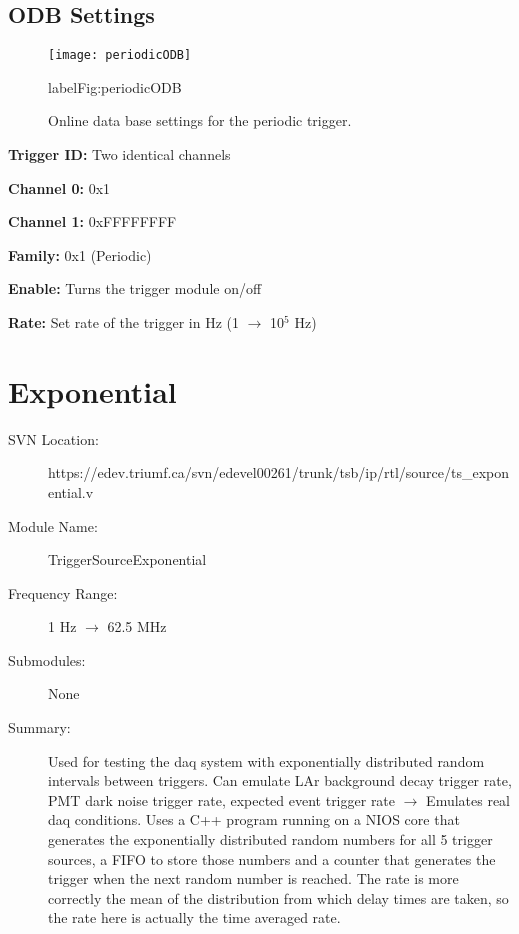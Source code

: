 \subsection{ODB Settings}
\label{sec:periodicODB}

\begin{figure}[ht]
\centering
\texttt{[image: periodicODB]}
\caption{Online data base settings for the periodic trigger.}
label{Fig:periodicODB}
\end{figure}

\begin{description}
\item \textbf{Trigger ID: } Two identical channels
	\begin{description}
	\item \textbf{Channel 0: }0x1
	\item \textbf{Channel 1: }0xFFFFFFFF
	\end{description}

\item \textbf{Family: } 0x1 (Periodic)

\item \textbf{Enable: }Turns the trigger module on/off

\item \textbf{Rate: }Set rate of the trigger in Hz (1 $\rightarrow$ 10$^5$ Hz)
\end{description}

\section{Exponential}


\begin{description}
\item[SVN Location: ]https://edev.triumf.ca/svn/edevel00261/trunk/tsb/ip/rtl/source/ts\_exponential.v
\item[Module Name: ]TriggerSourceExponential
\item[Frequency Range: ]1 Hz $\rightarrow$ 62.5 MHz
\item[Submodules: ]None
\item[Summary: ] Used for testing the \gls{daq} system with exponentially distributed random intervals between triggers. Can emulate LAr background decay trigger rate, PMT dark noise trigger rate, expected event trigger rate $\rightarrow$ Emulates real \gls{daq} conditions. Uses a C++ program running on a NIOS core that generates the exponentially distributed random numbers for all 5 trigger sources, a FIFO to store those numbers and a counter that generates the trigger when the next random number is reached. The rate is more correctly the mean of the distribution from which delay times are taken, so the rate here is actually the time averaged rate.
\end{description}

